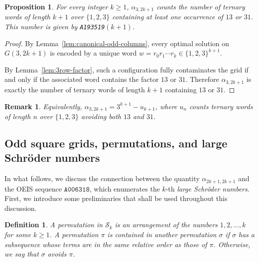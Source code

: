 \documentclass[letterpaper,12pt]{article}
\newtheorem{proposition}{Proposition}
\newtheorem{definition}{Definition}
\newtheorem{remark}{Remark}
\begin{document}
\begin{proposition}\label{prop:alpha-3-odd}
For every integer \(k\ge 1\), $\alpha_{3,2k+1}$ counts the number of ternary words of length \(k+1\) over \(\{1,2,3\}\)
containing at least one occurrence of \(13\) or \(31\). This number is given by \textup{\texttt{A193519}}$(k+1)$.
\end{proposition}


 

\begin{proof}
By Lemma~\ref{lem:canonical-odd-columns}, every optimal solution on
\(G(3,2k+1)\) is encoded by a unique word $w=r_0r_1\cdots r_k\in\{1,2,3\}^{k+1}$.

By Lemma~\ref{lem:3row-factor}, such a configuration fully contaminates the grid
if and only if the associated word contains the factor \(13\) or \(31\).
Therefore \(\alpha_{3,2k+1}\) is exactly the number of ternary words of length
\(k+1\) containing \(13\) or \(31\).\qedhere
\end{proof}
 


 


\begin{remark}
Equivalently, $\alpha_{3, 2k+1}=3^{k+1}-u_{k+1}$, where $u_{n}$ counts ternary words of length $n$ over $\{1,2,3\}$ avoiding both $13$ and $31$.
\end{remark}






\subsection{Odd square grids, permutations, and large Schr\"oder numbers}

 




In what follows, we discuss the connection between the quantity 
$\alpha_{2k+1, 2k+1}$ and the OEIS sequence $\texttt{A006318}$, 
which enumerates the $k$-th \emph{large Schröder numbers}. First, we introduce some preliminaries that shall be used throughout this discussion.
\begin{definition}
    A permutation in $\mathcal{S}_{k}$ is an arrangement of the numbers $1, 2, \ldots, k$ for some $k \geq 1$.  
A permutation $\pi$ is \emph{contained} in another permutation $\sigma$ if $\sigma$ has a subsequence whose terms are in the same relative order as those of $\pi$. Otherwise, we say that $\sigma$ \emph{avoids} $\pi$.
\end{definition}
\end{document}

